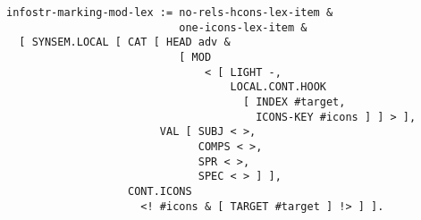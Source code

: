 \documentclass[a4paper]{article}
\begin{document}
{\small\begin{verbatim}
infostr-marking-mod-lex := no-rels-hcons-lex-item &
                           one-icons-lex-item &
  [ SYNSEM.LOCAL [ CAT [ HEAD adv &
                           [ MOD 
                               < [ LIGHT -,
                                   LOCAL.CONT.HOOK 
                                     [ INDEX #target,
                                       ICONS-KEY #icons ] ] > ],
                        VAL [ SUBJ < >, 
                              COMPS < >, 
                              SPR < >, 
                              SPEC < > ] ],
                   CONT.ICONS 
                     <! #icons & [ TARGET #target ] !> ] ].
\end{verbatim}}
\end{document}
